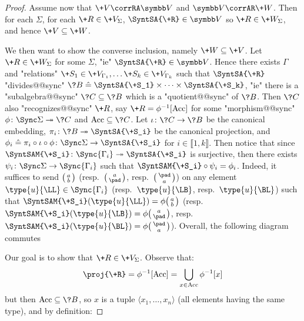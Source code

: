 \begin{proof}
	 Assume now that $\+V \corrRA \B{V}$
	and $\B{V} \corrAR \+W$. Then for each $\Sigma$, for each $\+R \in \+V_{\Sigma}$,
	$\SyntSA{\+R} \in \B{V}$ so $\+R \in \+W_{\Sigma}$, and hence $\+V \subseteq \+W$.

	We then want to show the converse inclusion, namely $\+W \subseteq \+V$. Let $\+R \in \+W_{\Sigma}$ for some $\Sigma$, "ie" $\SyntSA{\+R} \in \B{V}$.
	Hence there exists $\Gamma$ and "relations" $\+S_1 \in \+V_{\Gamma_1}, \hdots \+S_k \in \+V_{\Gamma_k}$
	such that $\SyntSA{\+R}$ "divides@@sync"
	$\?B \defeq \SyntSA{\+S_1} \times \cdots \times \SyntSA{\+S_k}$,
	"ie" there is a "subalgebra@@sync" $\?C \subseteq \?B$ which is a "quotient@@sync" of $\?B$.
	Then $\?C$ also "recognizes@@sync" $\+R$, say $\+R = \phi^{-1}[\Acc]$ for some
	"morphism@@sync" $\phi\colon \Sync\Sigma \surj \?C$ and $\Acc \subseteq \?C$.
	Let $\iota\colon \?C \to \?B$ be the canonical embedding,
	$\pi_i\colon \?B \surj \SyntSA{\+S_i}$ be the canonical projection,
	and $\phi_i \defeq \pi_i \circ \iota \circ \phi\colon \Sync\Sigma \to \SyntSA{\+S_i}$
	for $i \in \lBrack 1, k\rBrack$. Then notice that since $\SyntSAM{\+S_i}\colon \Sync{\Gamma_i} \surj \SyntSA{\+S_i}$ is surjective, then there exists $\psi_i \colon \Sync\Sigma \to \Sync{\Gamma_i}$ such that $\SyntSAM{\+S_i} \circ \psi_i = \phi_i$. Indeed, it suffices
	to send $\pair{a}{b}$ (resp.~$\pair{a}{\pad}$, resp.~$\pair{\pad}{a}$)
	on any element $\type{u}{\LL} \in \Sync{\Gamma_i}$ (resp.~$\type{u}{\LB}$,
	resp.~$\type{u}{\BL}$) such that $\SyntSAM{\+S_i}(\type{u}{\LL}) = \phi\pair{a}{b}$
	(resp.~$\SyntSAM{\+S_i}(\type{u}{\LB}) = \phi\pair{a}{\pad}$,
	resp.~$\SyntSAM{\+S_i}(\type{u}{\BL}) = \phi\pair{\pad}{a}$). Overall, the following diagram
	commutes
	\begin{center}
	\end{center}
	Our goal is to show that $\+R \in \+V_{\Sigma}$. Observe that:
	\[
		\proj{\+R} =
		\phi^{-1}[\Acc] = \bigcup_{x \in \Acc} \phi^{-1}[x]
	\]
	but then $\Acc \subseteq \?B$, so $x$ is a tuple $\langle x_1, \hdots, x_n \rangle$
	(all elements having the same type), and by definition:

\end{proof}
